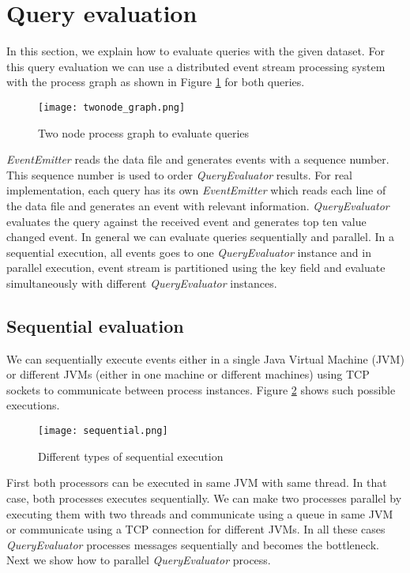 \section{Query evaluation}

In this section, we explain how to evaluate queries with the given dataset. For this query evaluation we can use a distributed event stream processing system with the process graph as shown in Figure \ref{twonode_graph} for both queries.

\begin{figure}[!t]
        \centering
        \texttt{[image: twonode\_graph.png]}
        \caption{Two node process graph to evaluate queries}
        \label{twonode_graph}
\end{figure}

\textit{EventEmitter} reads the data file and generates events with a sequence number. This sequence number is used to order \textit{QueryEvaluator} results. For real implementation, each query has its own \textit{EventEmitter} which reads each line of the data file and generates an event with relevant information. \textit{QueryEvaluator} evaluates the query against the received event and generates top ten value changed event.  In general we can evaluate queries sequentially and parallel. In a sequential execution, all events goes to one \textit{QueryEvaluator} instance and in parallel execution, event stream is partitioned using the key field and evaluate simultaneously with different \textit{QueryEvaluator} instances.

\subsection{Sequential evaluation}

We can sequentially execute events either in a single Java Virtual Machine (JVM) or different JVMs (either in one machine or different machines) using TCP sockets to communicate between process instances. Figure \ref{sequential} shows such possible executions. 

\begin{figure}[!t]
        \centering
        \texttt{[image: sequential.png]}
        \caption{Different types of sequential execution}
        \label{sequential}
\end{figure}

First both processors can be executed in same JVM with same thread. In that case, both processes executes sequentially. We can make two processes parallel by executing them with two threads and communicate using a queue in same JVM or communicate using a TCP connection for different JVMs. In all these cases \textit{QueryEvaluator} processes messages sequentially and becomes the bottleneck. Next we show how to parallel \textit{QueryEvaluator} process. 


